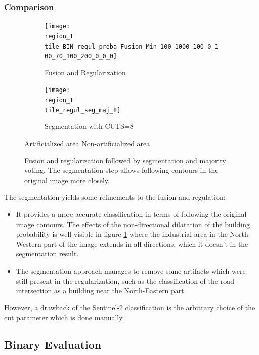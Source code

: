 \documentclass[10pt]{article}
\newcommand{\legendebin}{\vspace{3mm}
    
    \small\centering
    \fcolorbox{black}{red}{\rule{0pt}{6pt}\rule{6pt}{0pt}}\quad Artificialized area 
    \fcolorbox{black}{green}{\rule{0pt}{6pt}\rule{6pt}{0pt}}\quad Non-artificialized area
    }
\newcommand{\tile}{41000_30000}
\newcommand{\region}{finistere}
\begin{document}
\subsubsection{Comparison}
\newcommand{\figureBinRegulSeg}{
\begin{figure}[H]
    \centering
    \begin{subfigure}{0.49\textwidth}
        \centering
        \texttt{[image: \\region\_T\\tile\_BIN\_regul\_proba\_Fusion\_Min\_100\_1000\_100\_0\_100\_70\_100\_200\_0\_0\_0]}
        \caption{Fusion and Regularization}
        \label{subfig:fusionRegComp\tile}
    \end{subfigure}
    \begin{subfigure}{0.49\textwidth}
        \centering
        \texttt{[image: \\region\_T\\tile\_regul\_seg\_maj\_8]}
        \caption{Segmentation with CUTS=8}
    \end{subfigure}
    \legendebin
    \caption{Fusion and regularization followed by segmentation and majority voting. The segmentation step allows following contours in the original image more closely.}
    \label{fig:comparison\tile}
\end{figure}
}
\figureBinRegulSeg
The segmentation yields some refinements to the fusion and regulation:
\begin{itemize}
    \item It provides a more accurate classification in terms of following the original image contours. The effects of the non-directional dilatation of the building probability is well visible in figure \ref{subfig:fusionRegComp\tile} where the industrial area in the North-Western part of the image extends in all directions, which it doesn't in the segmentation result.
    \item The segmentation approach manages to remove some artifacts which were still present in the regularization, such as the classification of the road intersection as a building near the North-Eastern part.
\end{itemize}
However, a drawback of the Sentinel-2 classification is the arbitrary choice of the cut parameter which is done manually.

\subsection{Binary Evaluation}
\end{document}
